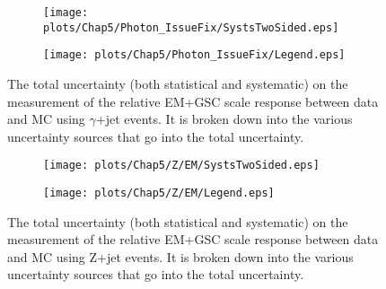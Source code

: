 \begin{figure}[!ht]
\captionsetup[subfigure]{labelformat=empty}
 \begin{center}
   \begin{subfigure}{0.55\textwidth}
     \hspace{-3cm}
     \texttt{[image: plots/Chap5/Photon\_IssueFix/SystsTwoSided.eps]}
   \end{subfigure}
   \begin{subfigure}{0.55\textwidth}
     \hspace{-3cm}
     \texttt{[image: plots/Chap5/Photon\_IssueFix/Legend.eps]}
   \end{subfigure} 
 \end{center}
 \caption[Uncertainty on the EM+GSC scale response measurement using $\gamma$+jet]
 {\small The total uncertainty (both statistical and systematic) on the measurement of the relative EM+GSC scale response between data and MC using $\gamma$+jet events.  It is broken down into the various uncertainty sources that go into the total uncertainty.  }
 \label{Fig:gJetSystsEM2016}
\end{figure}


\begin{figure}[!ht]
\captionsetup[subfigure]{labelformat=empty}
 \begin{center}
   \begin{subfigure}{0.55\textwidth}
     \hspace{-3cm}
     \texttt{[image: plots/Chap5/Z/EM/SystsTwoSided.eps]}
   \end{subfigure}
   \begin{subfigure}{0.55\textwidth}
     \hspace{-3cm}
     \texttt{[image: plots/Chap5/Z/EM/Legend.eps]}
   \end{subfigure}
 \end{center}
 \caption[Uncertainty on the EM+GSC scale response measurement using Z+jet]
 {\small The total uncertainty (both statistical and systematic) on the measurement of the relative EM+GSC scale response between data and MC using Z+jet events.  It is broken down into the various uncertainty sources that go into the total uncertainty.  }
 \label{Fig:ZJetSystsEM2016}
\end{figure}


